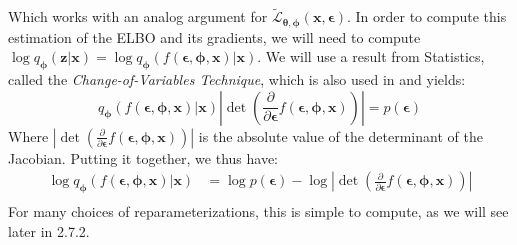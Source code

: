 \documentclass[12pt]{report}
\theoremstyle{definition}
\begin{document}
Which works with an analog argument for $\tilde{\mathcal{L}}_{\pmb{\theta}, \pmb{\phi}}(\mathbf{x}, \pmb{\epsilon})$. In order to compute this estimation of the ELBO and its gradients, we will need to compute $\log q_{\pmb{\phi}}(\mathbf{z}|\mathbf{x})=\log q_{\pmb{\phi}}(f(\pmb{\epsilon}, \pmb{\phi}, \mathbf{x})|\mathbf{x})$.
We will use a result from Statistics, called the \emph{Change-of-Variables Technique}, which is also used in \cite{kingma1} and yields:
\begin{equation}
q_{\pmb{\phi}}(f(\pmb{\epsilon}, \pmb{\phi}, \mathbf{x})|\mathbf{x}) \left|\det \left(\frac{\partial}{\partial \pmb{\epsilon}}f(\pmb{\epsilon}, \pmb{\phi}, \mathbf{x})\right)\right| = p(\pmb{\epsilon})
\end{equation}
Where $\left|\det \left(\frac{\partial}{\partial \pmb{\epsilon}}f(\pmb{\epsilon}, \pmb{\phi}, \mathbf{x})\right)\right|$ is the absolute value of the determinant of the Jacobian. Putting it together, we thus have:
\begin{equation}
\begin{split}
\log q_{\pmb{\phi}}(f(\pmb{\epsilon}, \pmb{\phi}, \mathbf{x})|\mathbf{x}) & = \log p(\pmb{\epsilon}) - \log \left|\det \left(\frac{\partial}{\partial \pmb{\epsilon}}f(\pmb{\epsilon}, \pmb{\phi}, \mathbf{x})\right)\right| \\
\end{split}
\end{equation}
For many choices of reparameterizations, this is simple to compute, as we will see later in 2.7.2.
\end{document}
